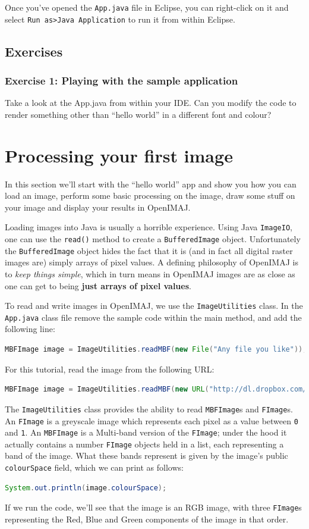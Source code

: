 \documentclass[10pt,a4paper,twoside,extrafontsizes]{memoir}
\begin{document}
Once you've opened the \verb+App.java+ file in Eclipse, you can right-click on it and select 
\verb+Run as>Java Application+ to run it from within Eclipse.

\section*{Exercises}
\subsection{Exercise 1: Playing with the sample application}
Take a look at the App.java from within your IDE. Can you modify the code to render something 
other than ``hello world'' in a different font and colour? 

\chapter{Processing your first image}
In this section we'll start with the ``hello world'' app and show you how you can load an image, 
perform some basic processing on the image, draw some stuff on your image and display your 
results in OpenIMAJ.

Loading images into Java is usually a horrible experience. Using Java \verb+ImageIO+, one can use the 
\verb+read()+ method to create a \verb+BufferedImage+ object. Unfortunately the \verb+BufferedImage+ 
object hides the fact that it is (and in fact all digital raster images are) simply arrays of pixel 
values. A defining philosophy of OpenIMAJ is to \emph{keep things simple}, which in turn means in OpenIMAJ 
images are as close as one can get to being \textbf{just arrays of pixel values}.

To read and write images in OpenIMAJ, we use the \verb+ImageUtilities+ class. In the \verb+App.java+ 
class file remove the sample code within the main method, and add the following line:
\begin{lstlisting}[language=java]
MBFImage image = ImageUtilities.readMBF(new File("Any file you like"));
\end{lstlisting}
For this tutorial, read the image from the following URL:
\begin{lstlisting}[language=java]
MBFImage image = ImageUtilities.readMBF(new URL("http://dl.dropbox.com/u/8705593/sinaface.jpg"));
\end{lstlisting}
The \verb+ImageUtilities+ class provides the ability to read \verb+MBFImage+s and \verb+FImage+s. 
An \verb+FImage+ is a greyscale image which represents each pixel as a value between \verb+0+ and 
\verb+1+. An \verb+MBFImage+ is a Multi-band version of the \verb+FImage+; under the hood it actually
contains a number \verb+FImage+ objects held in a list, each representing a band of the image. 
What these bands represent is given by the image's public \verb+colourSpace+ field, which we 
can print as follows:
\begin{lstlisting}[language=java]
System.out.println(image.colourSpace);
\end{lstlisting}
If we run the code, we'll see that the image is an RGB image, with three \verb+FImage+s representing 
the Red, Blue and Green components of the image in that order.
\end{document}
